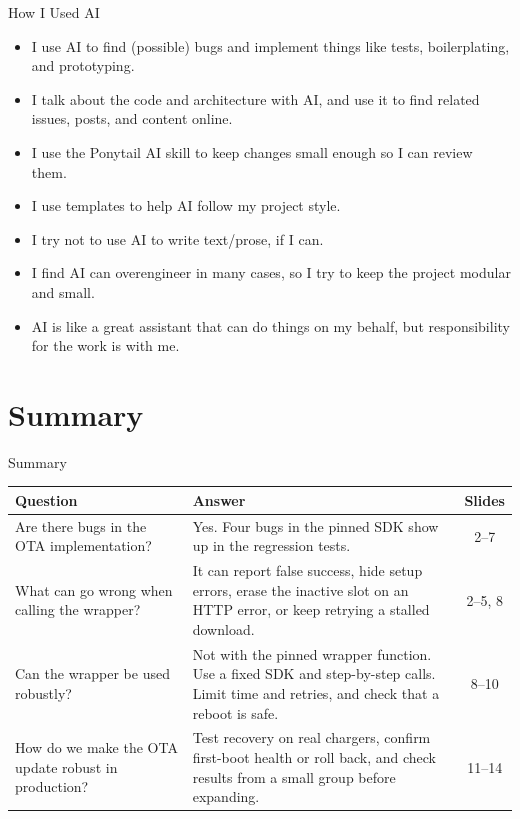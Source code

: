 \documentclass[aspectratio=169,11pt]{beamer}
\begin{document}
    \begin{frame}{How I Used AI}
        \begin{itemize}
            \item I use AI to find (possible) bugs and implement things like tests, boilerplating, and prototyping.
            \item I talk about the code and architecture with AI, and use it to find related issues, posts, and content online.
            \item I use the Ponytail AI skill to keep changes small enough so I can review them.
            \item I use templates to help AI follow my project style.
            \item I try not to use AI to write text/prose, if I can.
            \item I find AI can overengineer in many cases, so I try to keep the project modular and small.
            \item AI is like a great assistant that can do things on my behalf, but responsibility for the work is with me.
        \end{itemize}
    \end{frame}


    \section{Summary}

    \begin{frame}{Summary}
        \begingroup
        \renewcommand{\arraystretch}{1.24}
        \footnotesize
        \begin{tabularx}{\textwidth}{ >{\raggedright\arraybackslash}p{} X c }
            \toprule
            \rowcolor{Ink!10}
            \textbf{Question} & \textbf{Answer}                                                                                                                        & \textbf{Slides} \\
            \midrule
            Are there bugs in the OTA implementation?
            & Yes. Four bugs in the pinned SDK show up in the regression tests.                                                                      & 2--7            \\
            \rowcolor{RowTint}
            What can go wrong when calling the wrapper?
            & It can report false success, hide setup errors, erase the inactive slot on an HTTP error, or keep retrying a stalled download. & 2--5, 8 \\
            Can the wrapper be used robustly?
            & Not with the pinned wrapper function. Use a fixed SDK and step-by-step calls. Limit time and retries, and check that a reboot is safe. & 8--10 \\
            \rowcolor{RowTint}
            How do we make the OTA update robust in production?
            & Test recovery on real chargers, confirm first-boot health or roll back, and check results from a small group before expanding. & 11--14 \\
            \bottomrule
        \end{tabularx}
        \endgroup
    \end{frame}
\end{document}
